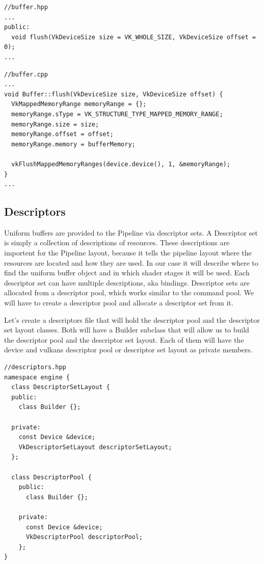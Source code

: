 \documentclass[12pt]{report} \usepackage{preamble}
\begin{document}
\begin{lstlisting}[Language=C++]
//buffer.hpp
...
public:
  void flush(VkDeviceSize size = VK_WHOLE_SIZE, VkDeviceSize offset = 0);
...
\end{lstlisting}

\begin{lstlisting}[Language=C++]
//buffer.cpp
...
void Buffer::flush(VkDeviceSize size, VkDeviceSize offset) {
  VkMappedMemoryRange memoryRange = {};
  memoryRange.sType = VK_STRUCTURE_TYPE_MAPPED_MEMORY_RANGE;
  memoryRange.size = size;
  memoryRange.offset = offset;
  memoryRange.memory = bufferMemory;

  vkFlushMappedMemoryRanges(device.device(), 1, &memoryRange);
}
...
\end{lstlisting}

\subsection{Descriptors}

Uniform buffers are provided to the Pipeline via descriptor sets. A Descriptor set is simply a collection of descriptions of resources.
These descriptions are importent for the Pipeline layout, because it tells the pipeline layout where the resources are located and how they are used.
In our case it will describe where to find the uniform buffer object and in which shader stages it will be used. Each descriptor set can have multiple descriptions,
aka bindings. Descriptor sets are allocated from a descriptor pool, which works similar to the command pool. We will have to create a descriptor pool and allocate a descriptor set from it.

Let's create a descriptors file that will hold the descriptor pool and the descriptor set layout classes. Both will have a Builder subclass that will allow us to build the descriptor pool and the descriptor set layout.
Each of them will have the device and vulkans descriptor pool or descriptor set layout as private members.

\begin{lstlisting}[Language=C++]
//descriptors.hpp
namespace engine {
  class DescriptorSetLayout {
  public:
    class Builder {};

  private:
    const Device &device;
    VkDescriptorSetLayout descriptorSetLayout;
  };

  class DescriptorPool {
    public:
      class Builder {};

    private:
      const Device &device;
      VkDescriptorPool descriptorPool;
    };
}
\end{lstlisting}
\end{document}
